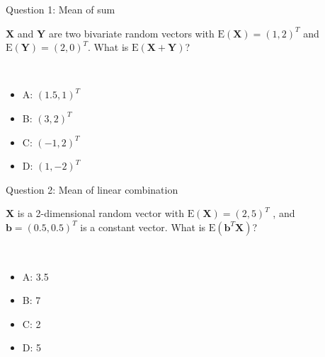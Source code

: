 \documentclass[
  ignorenonframetext,
]{beamer}
\providecommand{\tightlist}{%
  \setlength{\itemsep}{0pt}\setlength{\parskip}{0pt}}
\begin{document}
\begin{frame}
\begin{block}{Question 1: Mean of sum}
\protect\hypertarget{question-1-mean-of-sum}{}
\vspace{2mm}

\(\boldsymbol{X}\) and \(\boldsymbol{Y}\) are two bivariate random
vectors with \(\text{E}(\boldsymbol{X})=(1,2)^T\) and
\(\text{E}(\boldsymbol{Y})=(2,0)^T\). What is
\(\text{E}(\boldsymbol{X}+\boldsymbol{Y})\)?

\(~\)

\begin{itemize}
\tightlist
\item
  A: \((1.5,1)^T\)
\item
  B: \((3,2)^T\)
\item
  C: \((-1,2)^ T\)
\item
  D: \((1,-2)^T\)
\end{itemize}
\end{block}
\end{frame}

\begin{frame}
\begin{block}{Question 2: Mean of linear combination}
\protect\hypertarget{question-2-mean-of-linear-combination}{}
\vspace{2mm}

\(\boldsymbol{X}\) is a 2-dimensional random vector with
\(\text{E}(\boldsymbol{X})=(2,5)^T\) , and
\(\boldsymbol{b}=(0.5, 0.5)^T\) is a constant vector. What is
\(\text{E}(\boldsymbol{b}^T\boldsymbol{X})\)?

\(~\)

\begin{itemize}
\tightlist
\item
  A: 3.5
\item
  B: 7
\item
  C: 2
\item
  D: 5
\end{itemize}
\end{block}
\end{frame}
\end{document}
